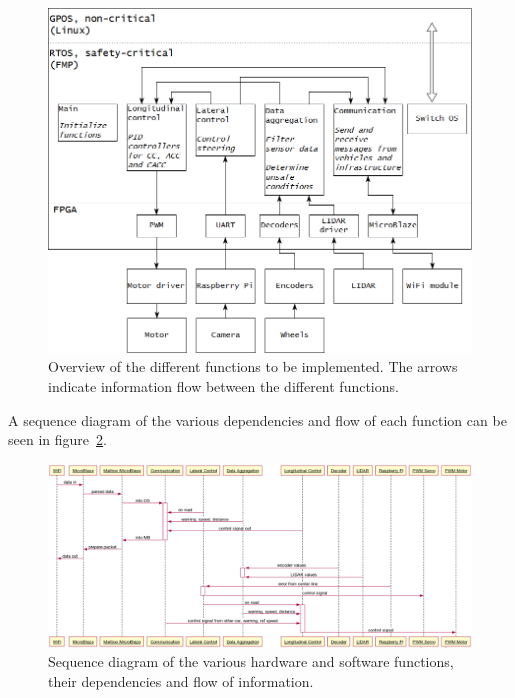 \begin{figure}[H]
\centering
\includegraphics[width=\textwidth]{./img/design_overview.png}
\caption{Overview of the different functions to be implemented. The arrows indicate information flow between the different functions.}\label{fig:overview}
\end{figure}

A sequence diagram of the various dependencies and flow of each function can be seen in figure~\ref{fig:sequence}.

\begin{figure}[H]
\centering
\includegraphics[width=\textwidth]{./img/design_sequence3.png}
\caption{Sequence diagram of the various hardware and software functions, their dependencies and flow of information.}\label{fig:sequence}
\end{figure}

\newpage
\mbox{}
